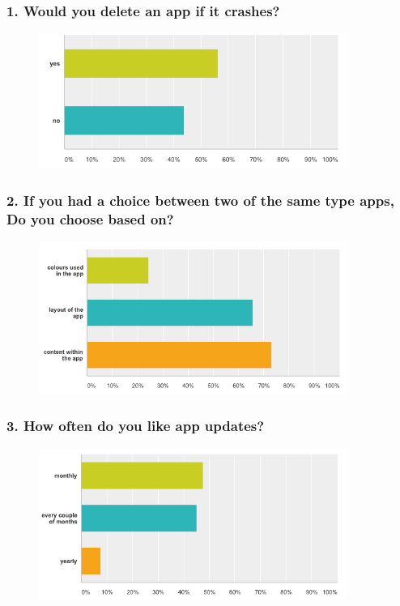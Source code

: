 \subsubsection{1. Would you delete an app if it crashes?}

\begin{figure}[!h]
    \centering
    \includegraphics[width=100mm]{images/survey/crashes}
    \label{fig:label}
\end{figure}

\subsubsection{2. If you had a choice between two of the same type apps, Do you choose based on?}

\begin{figure}[!h]
    \centering
    \includegraphics[width=100mm]{images/survey/choose}
    \label{fig:label}
\end{figure}

\subsubsection{3. How often do you like app updates?}

\begin{figure}[!h]
    \centering
    \includegraphics[width=100mm]{images/survey/time}
    \label{fig:label}
\end{figure}


